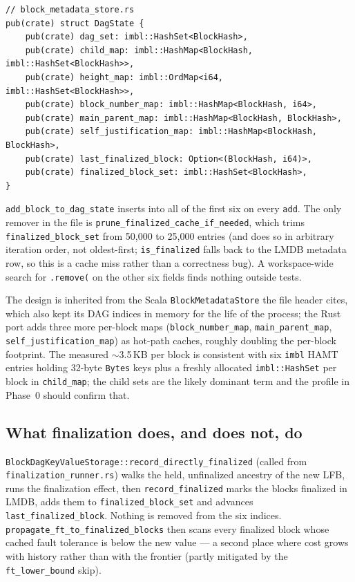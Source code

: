 \documentclass[11pt]{article}
\newcommand{\code}[1]{\texttt{#1}}
\begin{document}
\begin{lstlisting}
// block_metadata_store.rs
pub(crate) struct DagState {
    pub(crate) dag_set: imbl::HashSet<BlockHash>,
    pub(crate) child_map: imbl::HashMap<BlockHash, imbl::HashSet<BlockHash>>,
    pub(crate) height_map: imbl::OrdMap<i64, imbl::HashSet<BlockHash>>,
    pub(crate) block_number_map: imbl::HashMap<BlockHash, i64>,
    pub(crate) main_parent_map: imbl::HashMap<BlockHash, BlockHash>,
    pub(crate) self_justification_map: imbl::HashMap<BlockHash, BlockHash>,
    pub(crate) last_finalized_block: Option<(BlockHash, i64)>,
    pub(crate) finalized_block_set: imbl::HashSet<BlockHash>,
}
\end{lstlisting}

\code{add\_block\_to\_dag\_state} inserts into all of the first six on every
\code{add}. The only remover in the file is
\code{prune\_finalized\_cache\_if\_needed}, which trims
\code{finalized\_block\_set} from 50{,}000 to 25{,}000 entries (and does so in
arbitrary iteration order, not oldest-first; \code{is\_finalized} falls back to
the LMDB metadata row, so this is a cache miss rather than a correctness bug).
A workspace-wide search for \code{.remove(} on the other six fields finds
nothing outside tests.

The design is inherited from the Scala \code{BlockMetadataStore} the file
header cites, which also kept its DAG indices in memory for the life of the
process; the Rust port adds three more per-block maps
(\code{block\_number\_map}, \code{main\_parent\_map},
\code{self\_justification\_map}) as hot-path caches, roughly doubling the
per-block footprint. The measured $\sim$3.5\,KB per block is consistent with
six \code{imbl} HAMT entries holding 32-byte \code{Bytes} keys plus a freshly
allocated \code{imbl::HashSet} per block in \code{child\_map}; the child sets
are the likely dominant term and the profile in Phase~0 should confirm that.

\subsection{What finalization does, and does not, do}

\code{BlockDagKeyValueStorage::record\_directly\_finalized} (called from
\code{finalization\_runner.rs}) walks the held, unfinalized ancestry of the new
LFB, runs the finalization effect, then \code{record\_finalized} marks the
blocks finalized in LMDB, adds them to \code{finalized\_block\_set} and
advances \code{last\_finalized\_block}. Nothing is removed from the six
indices. \code{propagate\_ft\_to\_finalized\_blocks} then scans every
finalized block whose cached fault tolerance is below the new value --- a
second place where cost grows with history rather than with the frontier
(partly mitigated by the \code{ft\_lower\_bound} skip).
\end{document}
